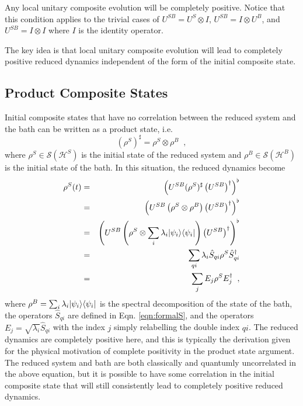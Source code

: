 Any local unitary composite evolution will be completely positive.  Notice that this condition applies to the trivial cases of $U^{SB} = U^S \otimes I$, $U^{SB} = I\otimes U^B$, and $U^{SB} = I\otimes I$ where $I$ is the identity operator. 

The key idea is that local unitary composite evolution will lead to completely positive reduced dynamics independent of the form of the initial composite state. 

\subsection{Product Composite States}
\label{sec:prodstates}
Initial composite states that have no correlation between the reduced system and the bath can be written as a product state, i.e.\
\begin{equation*}
(\rho^S)^\sharp = \rho^S \otimes \rho^B\;\;,
\end{equation*}
where $\rho^S\in\mathcal{S}(\mathcal{H}^S)$ is the initial state of the reduced system and $\rho^B\in\mathcal{S}(\mathcal{H}^B)$ is the initial state of the bath.  In this situation, the reduced dynamics become
\begin{eqnarray*}
\rho^S(t) &=& \left(U^{SB}(\rho^{S})^\sharp\left(U^{SB}\right)^\dagger\right)^\flat\\
&=&\left(U^{SB}\left(\rho^S\otimes\rho^B\right)\left(U^{SB}\right)^\dagger\right)^\flat\\
&=& \left(U^{SB}\left(\rho^S\otimes\sum_i \lambda_i |\psi_i\rangle\langle\psi_i|\right)\left(U^{SB}\right)^\dagger\right)^\flat\\
&=& \sum_{qi} \lambda_i \hat{S}_{qi} \rho^S \hat{S}^\dagger_{qi}\\
&=& \sum_j E_j \rho^S E_j^\dagger\;\;,
\end{eqnarray*}
where $\rho^B=\sum_i \lambda_i |\psi_i\rangle\langle\psi_i|$ is the spectral decomposition of the state of the bath, the operators $\hat{S}_{qi}$ are defined in Eqn. \ref{eqn:formalS}, and the operators $E_j=\sqrt{\lambda_i}\hat{S}_{qi}$ with the index $j$ simply relabelling the double index $qi$.  The reduced dynamics are completely positive here, and this is typically the derivation given for the physical motivation of complete positivity in the product state argument.  The reduced system and bath are both classically and quantumly uncorrelated in the above equation, but it is possible to have some correlation in the initial composite state that will still consistently lead to completely positive reduced dynamics.

